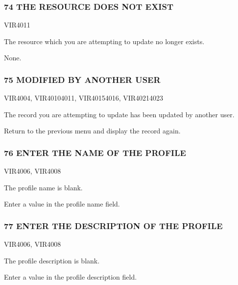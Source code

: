 \documentclass[letterpaper,10pt,english]{sphinxmanual}
\begin{document}
\subsubsection{74 THE RESOURCE DOES NOT EXIST}
\label{\detokenize{messages:the-resource-does-not-exist}}\begin{description}
\sphinxAtStartPar
VIR4011

\sphinxAtStartPar
The resource which you are attempting to update no longer exists.

\sphinxAtStartPar
None.

\end{description}


\subsubsection{75 MODIFIED BY ANOTHER USER}
\label{\detokenize{messages:modified-by-another-user}}\begin{description}
\sphinxAtStartPar
VIR4004, VIR4010\sphinxhyphen{}4011, VIR4015\sphinxhyphen{}4016, VIR4021\sphinxhyphen{}4023

\sphinxAtStartPar
The record you are attempting to update has been updated by another user.

\sphinxAtStartPar
Return to the previous menu and display the record again.

\end{description}


\subsubsection{76 ENTER THE NAME OF THE PROFILE}
\label{\detokenize{messages:enter-the-name-of-the-profile}}\begin{description}
\sphinxAtStartPar
VIR4006, VIR4008

\sphinxAtStartPar
The profile name is blank.

\sphinxAtStartPar
Enter a value in the profile name field.

\end{description}


\subsubsection{77 ENTER THE DESCRIPTION OF THE PROFILE}
\label{\detokenize{messages:enter-the-description-of-the-profile}}\begin{description}
\sphinxAtStartPar
VIR4006, VIR4008

\sphinxAtStartPar
The profile description is blank.

\sphinxAtStartPar
Enter a value in the profile description field.

\end{description}
\end{document}
